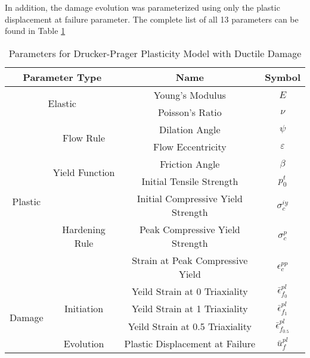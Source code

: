 


In addition, the damage evolution was parameterized using only the plastic displacement at failure parameter. The complete list of all 13 parameters can be found in Table \ref{tab:paramdruc}

\begin{table}[]
\centering
\caption{Parameters for Drucker-Prager Plasticity Model with Ductile Damage}
\label{tab:paramdruc}
\begin{tabular}{@{}cccc@{}}
\toprule
\multicolumn{2}{c}{Parameter Type}                         & Name                               & Symbol                                \\ \midrule
\multicolumn{2}{c}{\multirow{2}{*}{Elastic}}               & Young's Modulus                    & $E$                                   \\
\multicolumn{2}{c}{}                                       & Poisson's Ratio                    & $\nu$                                 \\ \cmidrule(r){1-2}
\multirow{7}{*}{Plastic} & \multirow{2}{*}{Flow Rule}      & Dilation Angle                     & $\psi$                                \\
                         &                                 & Flow Eccentricity                  & $\varepsilon$                         \\ \cmidrule(lr){2-2}
                         & \multirow{2}{*}{Yield Function} & Friction Angle                     & $\beta$                               \\
                         &                                 & Initial Tensile Strength           & $p_0^t$                               \\ \cmidrule(lr){2-2}
                         & \multirow{3}{*}{Hardening Rule} & Initial Compressive Yield Strength & $\sigma_c^{iy}$                       \\
                         &                                 & Peak Compressive Yield Strength    & $\sigma_c^{p}$                        \\
                         &                                 & Strain at Peak Compressive Yield   & $\epsilon_c^{pp}$                     \\ \cmidrule(r){1-2}
\multirow{4}{*}{Damage}  & \multirow{3}{*}{Initiation}     & Yeild Strain at 0 Triaxiality      & $\bar{\epsilon}^{pl}_{f_{0}}$   \\
                         &                                 & Yeild Strain at 1 Triaxiality      & $\bar{\epsilon}^{pl}_{f_{1}}$   \\
                         &                                 & Yeild Strain at 0.5 Triaxiality    & $\bar{\epsilon}^{pl}_{f_{0.5}}$ \\ \cmidrule(lr){2-2}
                         & Evolution                       & Plastic Displacement at Failure    & $\bar{u}^{pl}_f$                      \\ \bottomrule
\end{tabular}
\end{table}